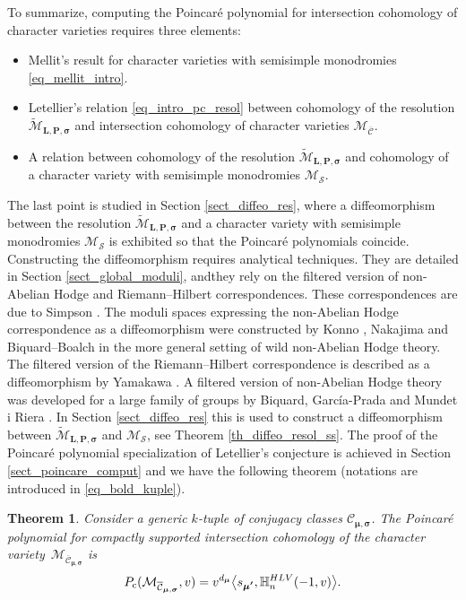 \documentclass[11pt]{article}
\newcommand{\rc}{\mathrm{c}}
\newcommand{\HLV}{\textup{HLV}}
\newcommand{\blangle}{\bigl\langle}
\newcommand{\brangle}{\bigr\rangle}
\theoremstyle{definition}
\theoremstyle{plain}
\newtheorem{theorem}[definition]{Theorem}
\newcommand{\mlps}{\widetilde{\mathcal{M}}_{\boldsymbol{L},\boldsymbol{P},\boldsymbol{\sigma}}}
\newcommand{\mcbar}{\mathcal{M}_{\boldsymbol{\overline{\mathcal{C}}}}}
\begin{document}
To summarize, computing the Poincaré polynomial for intersection cohomology of character varieties requires three elements:
\begin{itemize}
\item Mellit's result for character varieties with semisimple monodromies \eqref{eq_mellit_intro}.
\item Letellier's relation \eqref{eq_intro_pc_resol} between cohomology of the resolution $\mlps$ and intersection cohomology of character varieties $\mcbar$.
\item A relation between cohomology of the resolution $\mlps$ and cohomology of a character variety with semisimple monodromies $\mathcal{M}_{\boldsymbol{\mathcal{S}}}$.
\end{itemize}
The last point is studied in Section \ref{sect_diffeo_res}, where a diffeomorphism between the resolution $\mlps$ and a character variety with semisimple monodromies $\mathcal{M}_{\boldsymbol{\mathcal{S}}}$ is exhibited so that the Poincaré polynomials coincide. Constructing the diffeomorphism requires analytical techniques. They are detailed in Section \ref{sect_global_moduli}, andthey rely on the filtered version of non-Abelian Hodge and Riemann--Hilbert correspondences.
These correspondences are due to Simpson \cite{Simpson}. The moduli spaces expressing the non-Abelian Hodge correspondence as a diffeomorphism were constructed by Konno \cite{Konno}, Nakajima \cite{Nakajima_1996} and Biquard--Boalch \cite{Biquard_Boalch_2004} in the more general setting of wild non-Abelian Hodge theory. The filtered version of the Riemann--Hilbert correspondence is described as a diffeomorphism by Yamakawa \cite{Yamakawa}. A filtered version of non-Abelian Hodge theory was developed for a large family of groups by Biquard, García-Prada and Mundet i Riera \cite{Biquard_Garcia_Prada_Riera}. In Section \ref{sect_diffeo_res} this is used to construct a diffeomorphism between $\mlps$ and $\mathcal{M}_{\boldsymbol{\mathcal{S}}}$, see Theorem \ref{th_diffeo_resol_ss}. The proof of the Poincaré polynomial specialization of Letellier's conjecture is achieved in Section \ref{sect_poincare_comput} and we have the following theorem (notations are introduced in \eqref{eq_bold_kuple}).

\begin{theorem}\label{th_poincaré_intro}
Consider a generic $k$-tuple of conjugacy classes ${\mathcal{C}}_{\boldsymbol{\mu},\boldsymbol{\sigma}}$. The Poincaré polynomial for compactly supported intersection cohomology of the character variety~$\mathcal{M}_{\overline{{\mathcal{C}}}_{\boldsymbol{\mu},\boldsymbol{\sigma}}}$ is
\[
P_{\rc}(\mathcal{M}_{\overline{{\mathcal{C}}}_{\boldsymbol{\mu},\boldsymbol{\sigma}}},v) = v^{d_{\boldsymbol{\mu}}}\blangle s_{\boldsymbol{\mu'}}, \mathbb{H}_n^{\HLV}(-1,v)\brangle.
\]
\end{theorem}
\end{document}
